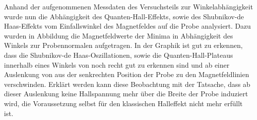 

Anhand der aufgenommenen Messdaten des Versuchsteils zur Winkelabhängigkeit wurde nun die Abhängigkeit des Quanten-Hall-Effekts, sowie des Shubnikov-de Haas-Effekts vom Einfallswinkel des Magnetfeldes auf die Probe analysiert.
Dazu wurden in Abbildung %
die Magnetfeldwerte der Minima in Abhängigkeit des Winkels zur Probennormalen aufgetragen. 
In der Graphik ist gut zu erkennen, dass die Shubnikov-de Haas-Oszillationen, sowie die Quanten-Hall-Plateaus innerhalb eines Winkels von %
noch recht gut zu erkennen sind und ab einer Auslenkung von %
aus der senkrechten Position der Probe zu den Magnetfeldlinien verschwinden. Erklärt werden kann diese Beobachtung mit der Tatsache, dass ab dieser Auslenkung keine Hallspannung mehr über die Breite der Probe induziert wird, die Voraussetzung selbst für den klassischen Halleffekt nicht mehr erfüllt ist.  %




